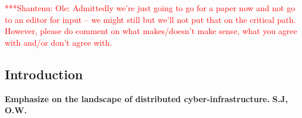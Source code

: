 \documentclass[a4paper,10pt]{article}
\newcommand{\jhanote}[1]{  {\textcolor{red}     { ***Shantenu: #1 }}}
\newcommand{\jhanote}[1]{}
\begin{document}
\jhanote{Ole: Admittedly we're just going to go for a paper now and
  not go to an editor for input -- we might still but we'll not put
  that on the critical path. However, please do comment on what
  makes/doesn't make sense, what you agree with and/or don't agree
  with.}


\subsection*{Introduction}

\textbf{Emphasize on the landscape of distributed cyber-infrastructure.} \textbf{S.J, O.W.}


 
\end{document}
